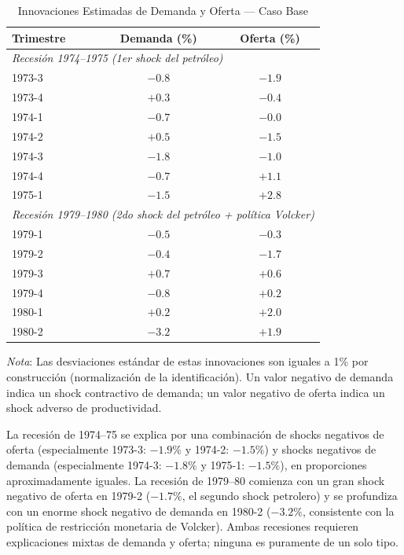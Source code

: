 \documentclass[12pt]{article}
\begin{document}
\begin{table}[h!]
\centering
\caption{Innovaciones Estimadas de Demanda y Oferta --- Caso Base}
\label{tab:innovaciones}
\begin{tabular}{lcc}
\toprule
\textbf{Trimestre} & \textbf{Demanda (\%)} & \textbf{Oferta (\%)} \\
\midrule
\multicolumn{3}{l}{\textit{Recesi\'on 1974--1975 (1er shock del petr\'oleo)}} \\
\midrule
1973-3 & $-0.8$ & $-1.9$ \\
1973-4 & $+0.3$ & $-0.4$ \\
1974-1 & $-0.7$ & $-0.0$ \\
1974-2 & $+0.5$ & $-1.5$ \\
1974-3 & $-1.8$ & $-1.0$ \\
1974-4 & $-0.7$ & $+1.1$ \\
1975-1 & $-1.5$ & $+2.8$ \\
\midrule
\multicolumn{3}{l}{\textit{Recesi\'on 1979--1980 (2do shock del petr\'oleo + pol\'itica Volcker)}} \\
\midrule
1979-1 & $-0.5$ & $-0.3$ \\
1979-2 & $-0.4$ & $-1.7$ \\
1979-3 & $+0.7$ & $+0.6$ \\
1979-4 & $-0.8$ & $+0.2$ \\
1980-1 & $+0.2$ & $+2.0$ \\
1980-2 & $-3.2$ & $+1.9$ \\
\bottomrule
\end{tabular}
\begin{flushleft}
\small \textit{Nota}: Las desviaciones est\'andar de estas innovaciones son iguales a 1\% por construcci\'on
(normalizaci\'on de la identificaci\'on). Un valor negativo de demanda indica un shock contractivo
de demanda; un valor negativo de oferta indica un shock adverso de productividad.
\end{flushleft}
\end{table}

\begin{hallazgo}
La recesi\'on de 1974--75 se explica por una combinaci\'on de shocks negativos de oferta (especialmente 1973-3: $-1.9\%$ y 1974-2: $-1.5\%$) y shocks negativos de demanda (especialmente 1974-3: $-1.8\%$ y 1975-1: $-1.5\%$), en proporciones aproximadamente iguales. La recesi\'on de 1979--80 comienza con un gran shock negativo de oferta en 1979-2 ($-1.7\%$, el segundo shock petrolero) y se profundiza con un enorme shock negativo de demanda en 1980-2 ($-3.2\%$, consistente con la pol\'itica de restricci\'on monetaria de Volcker). Ambas recesiones requieren explicaciones mixtas de demanda y oferta; ninguna es puramente de un solo tipo.
\end{hallazgo}
\end{document}
